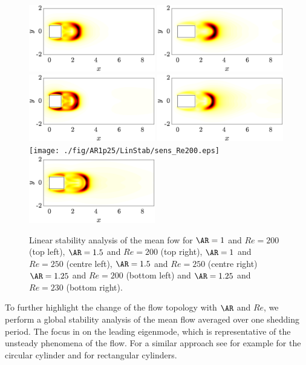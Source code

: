 \begin{figure}
  \centering
  \includegraphics[width=0.49\textwidth]{./fig/AR1/LinStab/sens_Re200.eps}
  \includegraphics[width=0.49\textwidth]{./fig/AR1p5/LinStab/sens_Re200.eps}
  \includegraphics[width=0.49\textwidth]{./fig/AR1/LinStab/sens_Re250.eps}
  \includegraphics[width=0.49\textwidth]{./fig/AR1p5/LinStab/sens_Re250.eps}
  \texttt{[image: ./fig/AR1p25/LinStab/sens\_Re200.eps]}
  \includegraphics[width=0.49\textwidth]{./fig/AR1p25/LinStab/sens_Re230.eps}
  \caption{Linear stability analysis of the mean fow for $\AR=1$ and $Re=200$ (top left), $\AR=1.5$ and $Re=200$ (top right), $\AR=1$ and $Re=250$ (centre left), $\AR=1.5$ and $Re=250$ (centre right) $\AR=1.25$ and $Re=200$ (bottom left) and $\AR=1.25$ and $Re=230$ (bottom right).}
  \label{fig:mf_sens}
\end{figure}
%
To further highlight the change of the flow topology with $\AR$ and $Re$, we perform a global stability analysis of the mean flow averaged over one shedding period. The focus in on the leading eigenmode, which is representative of the unsteady phenomena of the flow. For a similar approach see for example \cite{pier-2002,barkley-2006} for the circular cylinder and \cite{chiarini-quadrio-auteri-2022} for rectangular cylinders. 

